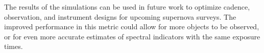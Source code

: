 The results of the simulations can be used in future work to optimize cadence, observation, and instrument designs for upcoming supernova surveys. The improved performance in this metric could allow for more objects to be observed, or for even more accurate estimates of spectral indicators with the same exposure times. 

